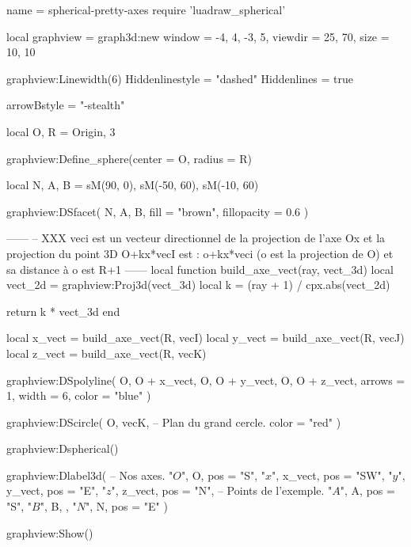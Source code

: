 \documentclass{standalone}
\begin{document}
\begin{luadraw}{name = spherical-pretty-axes}
require 'luadraw_spherical'

local graphview = graph3d:new{
  window  = {-4, 4, -3, 5},
  viewdir = {25, 70},
  size    = {10, 10}
}

graphview:Linewidth(6)
Hiddenlinestyle = "dashed"
Hiddenlines     = true

arrowBstyle = "-stealth"

local O, R = Origin, 3

graphview:Define_sphere({center = O, radius = R})

local N, A, B = sM(90, 0), sM(-50, 60), sM(-10, 60)

graphview:DSfacet(
  {N, A, B},
  {fill = "brown", fillopacity = 0.6}
)

------
-- XXX    veci est un vecteur directionnel de la projection de l'axe Ox et la projection du point 3D O+kx*vecI est : o+kx*veci (o est la projection de O) et sa distance à o est R+1
------
local function build_axe_vect(ray, vect_3d)
  local vect_2d = graphview:Proj3d(vect_3d)
  local k       = (ray + 1) / cpx.abs(vect_2d)

  return k * vect_3d
end

local x_vect = build_axe_vect(R, vecI)
local y_vect = build_axe_vect(R, vecJ)
local z_vect = build_axe_vect(R, vecK)

graphview:DSpolyline(
  {
    {O, O + x_vect},
    {O, O + y_vect},
    {O, O + z_vect}},
    {arrows = 1, width = 6, color = "blue"}
)

graphview:DScircle(
  {O, vecK},       -- Plan du grand cercle.
  {color = "red"}
)

graphview:Dspherical()

graphview:Dlabel3d(
-- Nos axes.
  "$O$", O, {pos = "S"},
  "$x$", x_vect, {pos = "SW"},
  "$y$", y_vect, {pos = "E"},
  "$z$", z_vect, {pos = "N"},
-- Points de l'exemple.
  "$A$", A, {pos = "S"},
  "$B$", B, {},
  "$N$", N, {pos = "E"}
)

graphview:Show()
\end{luadraw}
\end{document}
